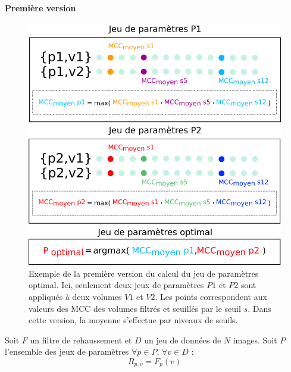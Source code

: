   \paragraph{Première version}

  \begin{figure}[!ht]
    \centering
    \includegraphics[width=\textwidth]{Images/optim_v1.png}
    \caption{Exemple de la première version du calcul du jeu de paramètres optimal. Ici, seulement deux jeux de paramètres $P1$ et $P2$ sont appliqués à deux volumes $V1$ et $V2$. Les points correspondent aux valeurs des MCC des volumes filtrés et seuillés par le seuil $s$. Dans cette version, la moyenne s'effectue par niveaux de seuils.}
    \label{fig:optim_v1}
  \end{figure}

  Soit $F$ un filtre de rehaussement et $D$ un jeu de données de $N$ images. Soit $P$ l'ensemble des jeux de paramètres
  $\forall p \in P$, $\forall v \in D$ :
  \begin{equation}
    R_{p,v} = F_{p}(v)
  \end{equation}

